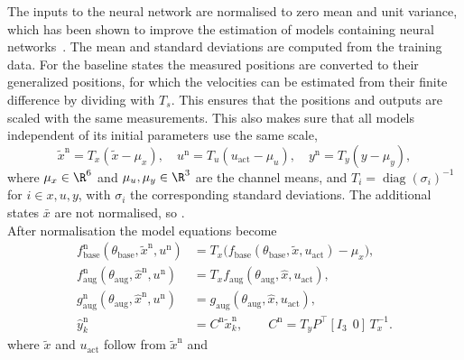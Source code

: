 The inputs to the neural network are normalised
to zero mean and unit variance, which has been shown to improve
the estimation of models containing neural networks~\cite[Sec.~5.3]{hoekstra2026lfr}.
The mean and standard deviations are computed from the training data.
For the baseline states the measured positions are converted to their generalized 
positions, for which the velocities can be estimated from their 
finite difference by dividing with $T_s$. 
This ensures that the positions and outputs are scaled with the same 
measurements. This also makes sure that 
all models independent of its initial parameters use the same scale, 
\begin{equation}
 \tilde x^{\mathrm n}=T_x(\tilde x-\mu_x),\quad
 u^{\mathrm n}=T_u(u_{\mathrm{act}}-\mu_u),\quad
 y^{\mathrm n}=T_y(y-\mu_y),
 \label{eq:aug_norm}
\end{equation}
where $\mu_x\in\R^6$ and $\mu_u,\mu_y\in\R^3$ are the channel means, 
and $T_i=\operatorname{diag}(\sigma_i)^{-1}$
for $i\in{x,u,y}$, with $\sigma_i$ the corresponding standard
deviations. The additional states $\bar x$ are not normalised,
so .
\\
After normalisation the model equations become
\begin{equation}
\begin{aligned}
 f^{\mathrm n}_{\mathrm{base}}(\theta_{\mathrm{base}},\tilde x^{\mathrm n},u^{\mathrm n})
 &=T_x\bigl(f_{\mathrm{base}}(\theta_{\mathrm{base}},\tilde x,u_{\mathrm{act}})-\mu_x\bigr),\\
 f^{\mathrm n}_{\mathrm{aug}}(\theta_{\mathrm{aug}},\hat x^{\mathrm n},u^{\mathrm n})
 &=T_xf_{\mathrm{aug}}(\theta_{\mathrm{aug}},\hat x,u_{\mathrm{act}}),\\
 g^{\mathrm n}_{\mathrm{aug}}(\theta_{\mathrm{aug}},\hat x^{\mathrm n},u^{\mathrm n})
 &=g_{\mathrm{aug}}(\theta_{\mathrm{aug}},\hat x,u_{\mathrm{act}}),\\
 \hat y^{\mathrm n}_k&=C^{\mathrm n}\tilde x^{\mathrm n}_k,\qquad
 C^{\mathrm n}=T_yP^\top[I_3\;\,0]\,T_x^{-1}.
\end{aligned}
\label{eq:aug_norm_maps}
\end{equation}
where $\tilde x$ and $u_{\mathrm{act}}$ follow from $\tilde x^{\mathrm n}$ and
